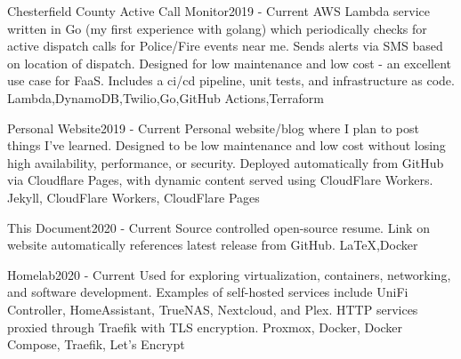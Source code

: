 \begin{projects}
    \project
    {Chesterfield County Active Call Monitor}{2019 - Current}
    {}
    {AWS Lambda service written in Go (my first experience with golang) which periodically checks for active dispatch calls for Police/Fire events near me. Sends alerts via SMS based on location of dispatch. Designed for low maintenance and low cost - an excellent use case for FaaS. Includes a ci/cd pipeline, unit tests, and infrastructure as code.}
    {Lambda,DynamoDB,Twilio,Go,GitHub Actions,Terraform}

    \project
    {Personal Website}{2019 - Current}
    {}
    {Personal website/blog where I plan to post things I've learned. Designed to be low maintenance and low cost without losing high availability, performance, or security. Deployed automatically from GitHub via Cloudflare Pages, with dynamic content served using CloudFlare Workers.}
    {Jekyll, CloudFlare Workers, CloudFlare Pages}

    \project
    {This Document}{2020 - Current}
    {\thislink{\website}}
    {Source controlled open-source resume. Link on website automatically references latest release from GitHub.}%
    {\LaTeX,Docker}

    \project
    {Homelab}{2020 - Current}
    {}
    {Used for exploring virtualization, containers, networking, and software development. Examples of self-hosted services include UniFi Controller, HomeAssistant, TrueNAS, Nextcloud, and Plex. HTTP services proxied through Traefik with TLS encryption.}
    {Proxmox, Docker, Docker Compose, Traefik, Let's Encrypt}
\end{projects}